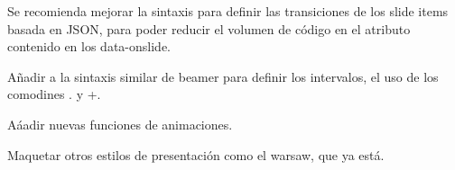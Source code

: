 
\begin{recomendations}

	Se recomienda mejorar la sintaxis para definir las transiciones de los slide items basada en JSON, para poder reducir el volumen de código en el atributo contenido en los data-onslide.

	Añadir a la sintaxis similar de beamer para definir los intervalos, el uso de los comodines . y +.

	Aáadir nuevas funciones de animaciones.

	Maquetar otros estilos de presentación como el warsaw, que ya está.

\end{recomendations}
